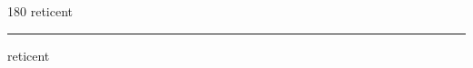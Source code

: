 
\begin{frame}
\begin{center}
\begin{turn}{180}
{\fontsize{2.5cm}{1em}\selectfont reticent}
\end{turn}
\vspace{1em}\par  
\hrule
\vspace{1em}\par  
{\fontsize{2.5cm}{1em}\selectfont reticent}
\end{center}
\end{frame}

